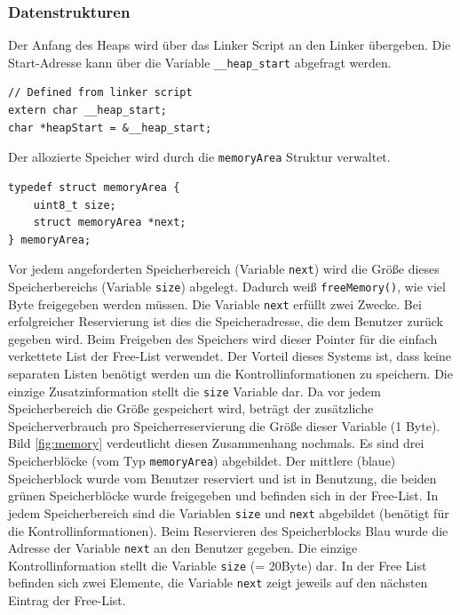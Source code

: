 \documentclass[fontsize=12pt, toc=bibliography, notitlepage]{scrreprt}
\begin{document}
\subsubsection{Datenstrukturen}
Der Anfang des Heaps wird über das Linker Script an den Linker übergeben. Die Start-Adresse kann über die Variable \lstinline$__heap_start$ abgefragt werden.

\begin{lstlisting}[title=memory.c]
// Defined from linker script
extern char __heap_start;
char *heapStart = &__heap_start;
\end{lstlisting}

Der allozierte Speicher wird durch die \lstinline$memoryArea$ Struktur verwaltet. 

\begin{lstlisting}[title=memory.c]
typedef struct memoryArea {
    uint8_t size;
    struct memoryArea *next;
} memoryArea;
\end{lstlisting}

Vor jedem angeforderten Speicherbereich (Variable \lstinline$next$) wird die Größe dieses Speicherbereichs (Variable \lstinline$size$) abgelegt. Dadurch weiß \lstinline$freeMemory()$, wie viel Byte freigegeben werden müssen. Die Variable \lstinline$next$ erfüllt zwei Zwecke. Bei erfolgreicher Reservierung ist dies die Speicheradresse, die dem Benutzer zurück gegeben wird. Beim Freigeben des Speichers wird dieser Pointer für die einfach verkettete List der Free-List verwendet. Der Vorteil dieses Systems ist, dass keine separaten Listen benötigt werden um die Kontrollinformationen zu speichern. Die einzige Zusatzinformation stellt die \lstinline$size$ Variable dar. Da vor jedem Speicherbereich die Größe gespeichert wird, beträgt der zusätzliche Speicherverbrauch pro Speicherreservierung die Größe dieser Variable (1 Byte).\\

Bild \ref{fig:memory} verdeutlicht diesen Zusammenhang nochmals. Es sind drei Speicherblöcke (vom Typ \lstinline$memoryArea$) abgebildet. Der mittlere (blaue) Speicherblock wurde vom Benutzer reserviert und ist in Benutzung, die beiden grünen Speicherblöcke wurde freigegeben und befinden sich in der Free-List. In jedem Speicherbereich sind die Variablen \lstinline$size$ und \lstinline$next$ abgebildet (benötigt für die Kontrollinformationen). Beim Reservieren des Speicherblocks Blau wurde die Adresse der Variable \lstinline$next$ an den Benutzer gegeben. Die einzige Kontrollinformation stellt die Variable \lstinline$size$ (= 20Byte) dar. In der Free List befinden sich zwei Elemente, die Variable \lstinline$next$ zeigt jeweils auf den nächsten Eintrag der Free-List.
\end{document}
